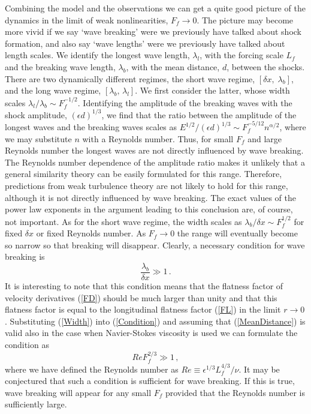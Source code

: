\documentclass{jfm}
\begin{document}
Combining the model and the observations we can get a quite good picture of the
dynamics in the limit of weak nonlinearities, $ F_{f} \rightarrow 0 $. The
picture may become more vivid if we say `wave breaking' were we previously have
talked about shock formation, and also say `wave lengths' were we previously
have talked about length scales. We identify the longest wave length, $
\lambda_l $, with the forcing scale $ L_f $ and the breaking wave length, $
\lambda_b $, with the mean distance, $ d $, between the shocks. There are two
dynamically different regimes, the short wave regime, $ [\delta x, \;
\lambda_b] $, and the long wave regime, $ [\lambda_b, \, \lambda_l] $. We first
consider the latter, whose width scales $ \lambda_{l} /\lambda_b \sim
F_f^{-1/2} $. Identifying the amplitude of the breaking waves with the shock
amplitude, $ (\epsilon d)^{1/3} $, we find that the ratio between the amplitude of
the longest waves and the breaking waves scales as $ E^{1/2}/(\epsilon d)^{1/3}
\sim F_{f}^{-5/12} n^{\alpha/2} $, where we may substitute $ n $ with a
Reynolds number. Thus, for small $ F_f $ and large Reynolds
number the longest waves are not directly influenced by wave breaking. The
Reynolds number dependence of the amplitude ratio makes it unlikely that a
general similarity theory can be easily formulated for this range. Therefore,
predictions from weak turbulence theory \cite[for
example][]{ZakharovSagdeev1970} are not likely to hold for this range, although
it is not directly influenced by wave breaking. The exact values of the power
law exponents in the argument leading to this conclusion are, of course, not
important. As for the short wave regime, the width scales as $ \lambda_b
/\delta x \sim F_f^{1/2} $ for fixed $ \delta x $ or fixed Reynolds number. As
$ F_{f} \rightarrow 0 $ the range will eventually become so narrow so that
breaking will disappear. Clearly, a necessary condition for wave breaking is 
\begin{equation} \label{Condition} 
\frac{\lambda_b}{\delta x} \gg 1 \, .
\end{equation} 
It is interesting to note that this condition means that the flatness factor of velocity derivatives (\ref{FD}) should be much larger than unity and that this flatness factor is equal to the longitudinal flatness factor (\ref{FL}) in the limit $ r \rightarrow 0 $.
Substituting (\ref{Width}) into (\ref{Condition})  and assuming that (\ref{MeanDistance}) is valid also in the case when Navier-Stokes viscosity is used we can formulate
the condition as
\begin{equation} 
Re F_f^{2/3} \gg 1 \, ,
\end{equation} 
where we have defined the Reynolds number as $ Re  \equiv \epsilon^{1/3} L_{f}^{4/3} / \nu $. It may be conjectured  that such a condition is sufficient for wave breaking. If this is true, 
wave breaking will appear for any small $ F_f $ provided that the Reynolds number is sufficiently large.
 
\end{document}
